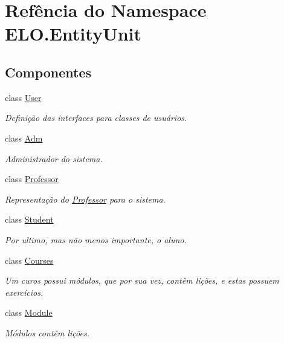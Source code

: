 \hypertarget{namespaceELO_1_1EntityUnit}{\section{Refência do Namespace E\-L\-O.\-Entity\-Unit}
\label{namespaceELO_1_1EntityUnit}
}
\subsection*{Componentes}
\begin{DoxyCompactItemize}
\item 
class \hyperlink{classELO_1_1EntityUnit_1_1User}{User}
\begin{DoxyCompactList}\small\item\em Definição das interfaces para classes de usuários. \end{DoxyCompactList}\item 
class \hyperlink{classELO_1_1EntityUnit_1_1Adm}{Adm}
\begin{DoxyCompactList}\small\item\em Administrador do sistema. \end{DoxyCompactList}\item 
class \hyperlink{classELO_1_1EntityUnit_1_1Professor}{Professor}
\begin{DoxyCompactList}\small\item\em Representação do \hyperlink{classELO_1_1EntityUnit_1_1Professor}{Professor} para o sistema. \end{DoxyCompactList}\item 
class \hyperlink{classELO_1_1EntityUnit_1_1Student}{Student}
\begin{DoxyCompactList}\small\item\em Por ultimo, mas não menos importante, o aluno. \end{DoxyCompactList}\item 
class \hyperlink{classELO_1_1EntityUnit_1_1Courses}{Courses}
\begin{DoxyCompactList}\small\item\em Um curos possui módulos, que por sua vez, contêm lições, e estas possuem exercícios. \end{DoxyCompactList}\item 
class \hyperlink{classELO_1_1EntityUnit_1_1Module}{Module}
\begin{DoxyCompactList}\small\item\em Módulos contêm lições. \end{DoxyCompactList}\item 

\end{DoxyCompactItemize}

